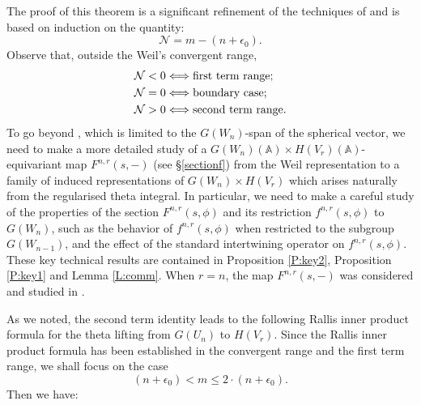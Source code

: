 \documentclass[10pt]{amsart}
\theoremstyle{plain}
\numberwithin{equation}{section}
\begin{document}
The proof of this theorem is a significant refinement of the
techniques of \cite{GT} and is based on induction on the quantity:
 \[  
\mathcal{N} = m - (n + \epsilon_0). 
\]
Observe that, outside the Weil's convergent range,
    \begin{align}
   &\mathcal{N} < 0 \Longleftrightarrow \text{first term range}; \notag \\
   &\mathcal{N} = 0 \Longleftrightarrow \text{boundary case}; \notag \\ 
  &\mathcal{N} > 0 \Longleftrightarrow \text{second term range}. \notag
 \end{align}
To go beyond \cite{GT}, which is limited to the $G(W_n)$-span of the spherical vector, we need to make a more detailed study of 
a  $G(W_n)({\mathbb{A}})\times H(V_r)({\mathbb{A}})$-equivariant map $F^{n,r}(s,-)$ (see \S \ref{sectionf}) from the Weil representation to a family of  induced representations of $G(W_n)\times H(V_r)$ which arises naturally from the regularised theta integral. In particular, we need to make 
a careful study of the properties of the section $F^{n,r}(s,\phi)$ and its restriction $f^{n,r}(s,\phi)$ to $G(W_n)$, such as the behavior of $f^{n,r}(s,\phi)$ when restricted to the subgroup $G(W_{n-1})$, and the effect of the standard intertwining operator on $f^{n,r}(s,\phi)$. 
These key technical results are contained in Proposition \ref{P:key2}, Proposition \ref{P:key1} and 
Lemma \ref{L:comm}.  When $r= n$, the map $F^{n,r}(s,-)$  was
considered and studied in \cite[Prop. 2.4]{Q}. 

\vskip 5pt

  
 As we noted, the second term identity leads to the following Rallis
 inner product formula for the theta lifting from $G(U_n)$ to
 $H(V_r)$.  Since the Rallis inner product formula has been established in the convergent range and the first term range, we shall focus on the case 
 \[ (n+\epsilon_0) < m \leq 2 \cdot (n+\epsilon_0).\]
 Then we have:
 
 \vskip 5pt
 
\end{document}
